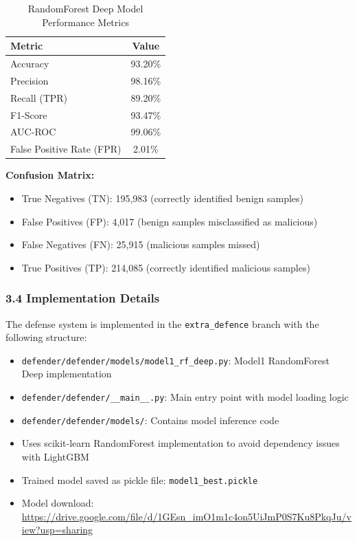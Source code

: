 \documentclass[12pt,letterpaper]{article}
\begin{document}
\begin{table}[h]
\centering
\begin{tabular}{|l|c|}
\hline
\textbf{Metric} & \textbf{Value} \\
\hline
Accuracy & 93.20\% \\
Precision & 98.16\% \\
Recall (TPR) & 89.20\% \\
F1-Score & 93.47\% \\
AUC-ROC & 99.06\% \\
False Positive Rate (FPR) & 2.01\% \\
\hline
\end{tabular}
\caption{RandomForest Deep Model Performance Metrics}
\end{table}

\textbf{Confusion Matrix:}
\begin{itemize}
    \item True Negatives (TN): 195,983 (correctly identified benign samples)
    \item False Positives (FP): 4,017 (benign samples misclassified as malicious)
    \item False Negatives (FN): 25,915 (malicious samples missed)
    \item True Positives (TP): 214,085 (correctly identified malicious samples)
\end{itemize}

\subsubsection*{3.4 Implementation Details}

The defense system is implemented in the \texttt{extra\_defence} branch with the following structure:
\begin{itemize}
    \item \texttt{defender/defender/models/model1\_rf\_deep.py}: Model1 RandomForest Deep implementation
    \item \texttt{defender/defender/\_\_main\_\_.py}: Main entry point with model loading logic
    \item \texttt{defender/defender/models/}: Contains model inference code
    \item Uses scikit-learn RandomForest implementation to avoid dependency issues with LightGBM
    \item Trained model saved as pickle file: \texttt{model1\_best.pickle}
    \item Model download: \url{https://drive.google.com/file/d/1GEsn_imO1m1c4on5UiJmP0S7Ku8PkqJu/view?usp=sharing}
\end{itemize}
\end{document}

